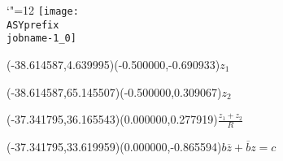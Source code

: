 \setlength{\unitlength}{1pt}%
\makeatletter%
\let\ASYencoding\f@encoding%
\let\ASYfamily\f@family%
\let\ASYseries\f@series%
\let\ASYshape\f@shape%
\makeatother%
{\catcode`"=12%
\texttt{[image: \\ASYprefix\\jobname-1\_0]}%
}%
%
\fontsize{6.000000}{7.200000}\selectfont%
\usefont{\ASYencoding}{\ASYfamily}{\ASYseries}{\ASYshape}%
\ASYalign(-38.614587,4.639995)(-0.500000,-0.690933){$z_1$}%
%
\fontsize{6.000000}{7.200000}\selectfont%
\ASYalign(-38.614587,65.145507)(-0.500000,0.309067){$z_2$}%
%
\fontsize{6.000000}{7.200000}\selectfont%
\ASYalign(-37.341795,36.165543)(0.000000,0.277919){$\frac{z_1 + z_2}{R}$}%
%
\fontsize{6.000000}{7.200000}\selectfont%
\ASYalign(-37.341795,33.619959)(0.000000,-0.865594){$b\overline{z} + \overline{b}z = c$}%
